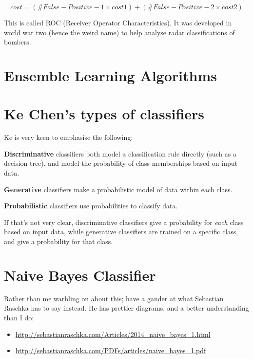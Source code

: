 \[
  cost = (\#False-Positive-1 \times cost1) + (\#False-Positive-2 \times cost2)
\]

This is called ROC (Receiver Operator Characteristics). It was developed in
world war two (hence the weird name) to help analyse radar classifications of
bombers.

\section{Ensemble Learning Algorithms}


\section{Ke Chen's types of classifiers}

Ke is very keen to emphasise the following:

\begin{description}
  \item \textbf{Discriminative} classifiers both model a classification rule
    directly (such as a decision tree), and model the probability of class
    memberships based on input data.
  \item \textbf{Generative} classifiers make a probabilistic model of data
    within each class.
  \item \textbf{Probabilistic} classifiers use probabilities to classify data.
\end{description}

If that's not very clear, discriminative classifiers give a probability for
\textit{each} class based on input data, while generative classifiers are
trained on a specific class, and give a probability for that class.

\section{Naive Bayes Classifier}

Rather than me warbling on about this; have a gander at what Sebastian Raschka
has to say instead. He has prettier diagrams, and a better understanding than I
do:

\begin{itemize}
  \item \url{http://sebastianraschka.com/Articles/2014_naive_bayes_1.html}

  \item \url{http://sebastianraschka.com/PDFs/articles/naive_bayes_1.pdf}
\end{itemize}

